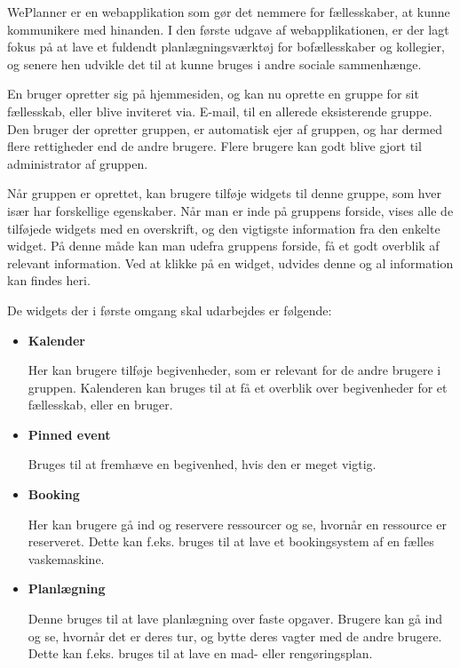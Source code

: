 \noindent WePlanner er en webapplikation som gør det nemmere for fællesskaber, at kunne kommunikere med hinanden. I den første udgave af webapplikationen, er der lagt fokus på at lave et fuldendt planlægningsværktøj for bofællesskaber og kollegier, og senere hen udvikle det til at kunne bruges i andre sociale sammenhænge.

En bruger opretter sig på hjemmesiden, og kan nu oprette en gruppe for sit fællesskab, eller blive inviteret via. E-mail, til en allerede eksisterende gruppe. Den bruger der opretter gruppen, er automatisk ejer af gruppen, og har dermed flere rettigheder end de andre brugere. Flere brugere kan godt blive gjort til administrator af gruppen.

Når gruppen er oprettet, kan brugere tilføje widgets til denne gruppe, som hver især har forskellige egenskaber. Når man er inde på gruppens forside, vises alle de tilføjede widgets med en overskrift, og den vigtigste information fra den enkelte widget. På denne måde kan man udefra gruppens forside, få et godt overblik af relevant information. Ved at klikke på en widget, udvides denne og al information kan findes heri.

\noindent De widgets der i første omgang skal udarbejdes er følgende:

\begin{itemize}
\item  \textbf{Kalender}

Her kan brugere tilføje begivenheder, som er relevant for de andre brugere i gruppen. Kalenderen kan bruges til at få et overblik over begivenheder for et fællesskab, eller en bruger.
\end{itemize}

\begin{itemize}
\item  \textbf{Pinned event}

Bruges til at fremhæve en begivenhed, hvis den er meget vigtig.
\end{itemize}


\begin{itemize}
\item  \textbf{Booking}

Her kan brugere gå ind og reservere ressourcer og se, hvornår en ressource er reserveret. Dette kan f.eks. bruges til at lave et bookingsystem af en fælles vaskemaskine.
\end{itemize}

\begin{itemize}
\item  \textbf{Planlægning}

Denne bruges til at lave planlægning over faste opgaver. Brugere kan gå ind og se, hvornår det er deres tur, og bytte deres vagter med de andre brugere. Dette kan f.eks. bruges til at lave en mad- eller rengøringsplan.
\end{itemize}

